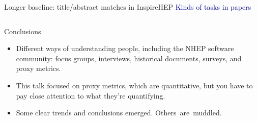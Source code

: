 \documentclass[aspectratio=169]{beamer}
\begin{document}
\begin{frame}{Longer baseline: title/abstract matches in InspireHEP}
\vspace{0.35 cm}
\textcolor{darkblue}{Kinds of tasks in  papers}

\begin{columns}
\end{columns}
\end{frame}

\begin{frame}{Conclusions}
\Large
\vspace{0.5 cm}
\begin{itemize}\setlength{\itemsep}{0.5 cm}
\item Different ways of understanding people, including the NHEP software community: focus groups, interviews, historical documents, surveys, and proxy metrics.

\item This talk focused on proxy metrics, which are quantitative, but you have to pay close attention to what they're quantifying.

\item Some clear trends and conclusions emerged. \mbox{Others are muddled.\hspace{-1 cm}}
\end{itemize}
\end{frame}
\end{document}
